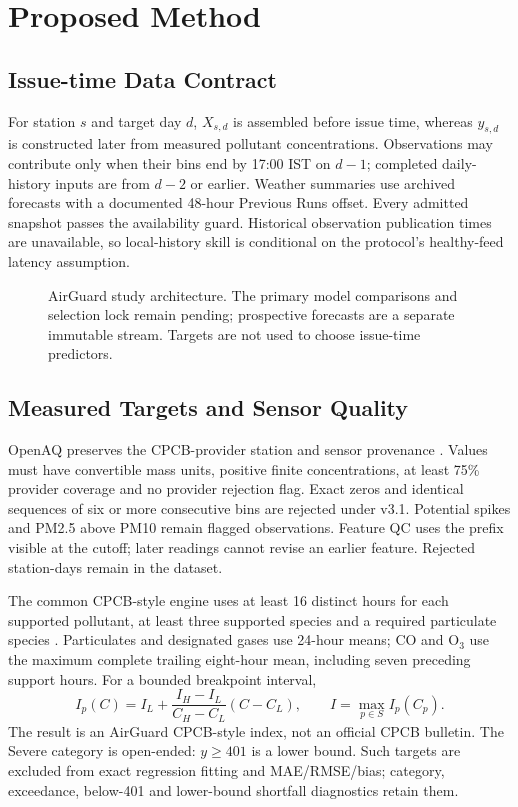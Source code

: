 \section{Proposed Method}
\subsection{Issue-time Data Contract}
For station $s$ and target day $d$, $X_{s,d}$ is assembled before issue time,
whereas $y_{s,d}$ is constructed later from measured pollutant concentrations.
Observations may contribute only when their bins end by 17:00 IST on $d-1$;
completed daily-history inputs are from $d-2$ or earlier. Weather summaries
use archived forecasts with a documented 48-hour Previous Runs offset.
Every admitted snapshot passes the availability guard. Historical observation
publication times are unavailable, so local-history skill is conditional on
the protocol's healthy-feed latency assumption.

\begin{figure}[t]\centering\footnotesize\AirGuardArchitecture
\caption{AirGuard study architecture. The primary model comparisons and
selection lock remain pending; prospective forecasts are a separate immutable
stream. Targets are not used to choose issue-time predictors.}\label{fig:architecture}
\end{figure}

\subsection{Measured Targets and Sensor Quality}
OpenAQ preserves the CPCB-provider station and sensor provenance
\cite{openaq2026}. Values must have convertible mass units, positive finite
concentrations, at least 75\% provider coverage and no provider rejection flag.
Exact zeros and identical sequences of six or more consecutive bins are
rejected under v3.1. Potential spikes and PM2.5 above PM10 remain flagged
observations. Feature QC uses the prefix visible at the cutoff; later readings
cannot revise an earlier feature. Rejected station-days remain in the dataset.

The common CPCB-style engine uses at least 16 distinct hours for each supported
pollutant, at least three supported species and a required particulate species
\cite{cpcb2014aqi}. Particulates and designated gases use 24-hour means;
CO and O$_3$ use the maximum complete trailing eight-hour mean, including
seven preceding support hours. For a bounded breakpoint interval,
\begin{equation}
I_p(C)=I_L+\frac{I_H-I_L}{C_H-C_L}(C-C_L),\qquad
I=\max_{p\in S}I_p(C_p).\label{eq:aqi}
\end{equation}
The result is an AirGuard CPCB-style index, not an official CPCB bulletin.
The Severe category is open-ended: $y\geq401$ is a lower bound.
Such targets are excluded from exact regression fitting and MAE/RMSE/bias;
category, exceedance, below-401 and lower-bound shortfall diagnostics retain them.

